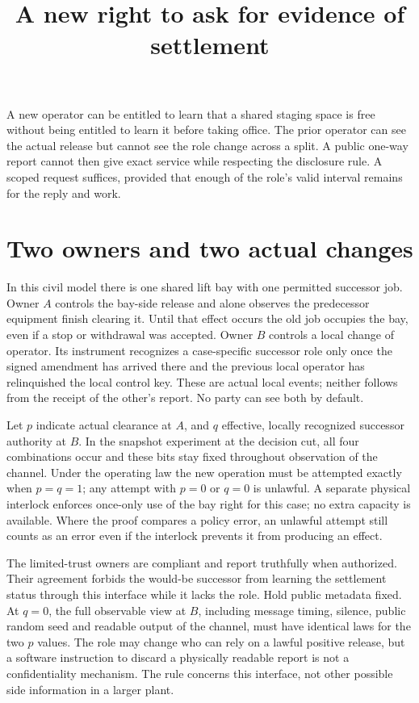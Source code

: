 \documentclass[11pt]{article}
\title{A new right to ask for evidence of settlement}
\date{}
\begin{document}
\maketitle

A new operator can be entitled to learn that a shared staging
space is free without being entitled to learn it before taking
office. The prior operator can see the actual release but cannot
see the role change across a split. A public one-way report cannot
then give exact service while respecting the disclosure rule.
A scoped request suffices, provided that enough of the role's
valid interval remains for the reply and work.

\section{Two owners and two actual changes}
In this civil model there is one shared lift bay with one permitted
successor job. Owner \(A\) controls the bay-side release and
alone observes the predecessor equipment finish clearing it.
Until that effect occurs the old job occupies the bay, even if
a stop or withdrawal was accepted. Owner \(B\) controls a local
change of operator. Its instrument recognizes a case-specific
successor role only once the signed amendment has arrived there
and the previous local operator has relinquished the local control
key. These are actual local events; neither follows from the
receipt of the other's report. No party can see both by default.

Let \(p\) indicate actual clearance at \(A\), and \(q\) effective,
locally recognized successor authority at \(B\). In the snapshot
experiment at the decision cut, all four combinations occur and
these bits stay fixed throughout observation of the channel.
Under the operating law the new operation must be attempted
exactly when \(p=q=1\); any attempt with \(p=0\) or \(q=0\) is
unlawful. A separate physical interlock enforces once-only use
of the bay right for this case; no extra capacity is available.
Where the proof compares a policy error, an unlawful attempt
still counts as an error even if the interlock prevents it
from producing an effect.

The limited-trust owners are compliant and report truthfully when
authorized. Their agreement forbids the would-be successor from
learning the settlement status through this interface while it
lacks the role. Hold public metadata fixed. At \(q=0\), the full
observable view at \(B\), including message timing, silence,
public random seed and readable output of the channel, must have
identical laws for the two \(p\) values. The role may change who
can rely on a lawful positive release, but a software instruction
to discard a physically readable report is not a confidentiality
mechanism. The rule concerns this interface, not other possible
side information in a larger plant.
\end{document}
